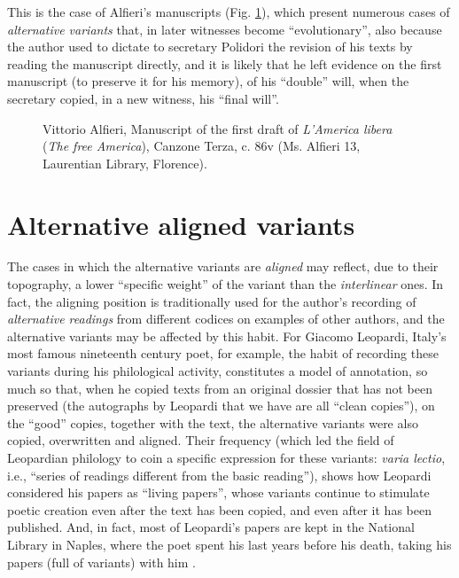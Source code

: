 \begin{paper}
This is the case of Alfieri's manuscripts (Fig. \ref{fig:italia3}), which present
numerous cases of \emph{alternative variants} that, in later witnesses
become ``evolutionary'', also because the author used to dictate to
secretary Polidori the revision of his texts by reading the manuscript
directly, and it is likely that he left evidence on the first manuscript
(to preserve it for his memory), of his ``double'' will, when the
secretary copied, in a new witness, his ``final will''.

\begin{figure}[H]
    \centering
    \caption{Vittorio Alfieri, Manuscript of the first draft of
\emph{L'America libera} (\emph{The free America}), Canzone Terza, c. 86v
(Ms. Alfieri 13, Laurentian Library, Florence).}
    \label{fig:italia3}
\end{figure}

\section{Alternative aligned variants}

The cases in which the alternative variants are \emph{aligned} may
reflect, due to their topography, a lower ``specific weight'' of the
variant than the \emph{interlinear} ones. In fact, the aligning position
is traditionally used for the author's recording of \emph{alternative
readings} from different codices on examples of other authors, and the
alternative variants may be affected by this habit. For Giacomo
Leopardi, Italy's most famous nineteenth century poet, for example, the habit of
recording these variants during his philological activity, constitutes a
model of annotation, so much so that, when he copied texts from an
original dossier that has not been preserved (the autographs by Leopardi
that we have are all ``clean copies''), on the ``good'' copies, together
with the text, the alternative variants were also copied, overwritten
and aligned. Their frequency (which led the field of Leopardian
philology to coin a specific expression for these variants: \emph{varia
lectio}, i.e., ``series of readings different from the basic reading''),
shows how Leopardi considered his papers as ``living papers'', whose
variants continue to stimulate poetic creation even after the text has
been copied, and even after it has been published. And, in fact, most of
Leopardi's papers are kept in the National Library in Naples, where the
poet spent his last years before his death, taking his papers (full of
variants) with him \parencite{italia_lo_2019}.


\end{paper}
